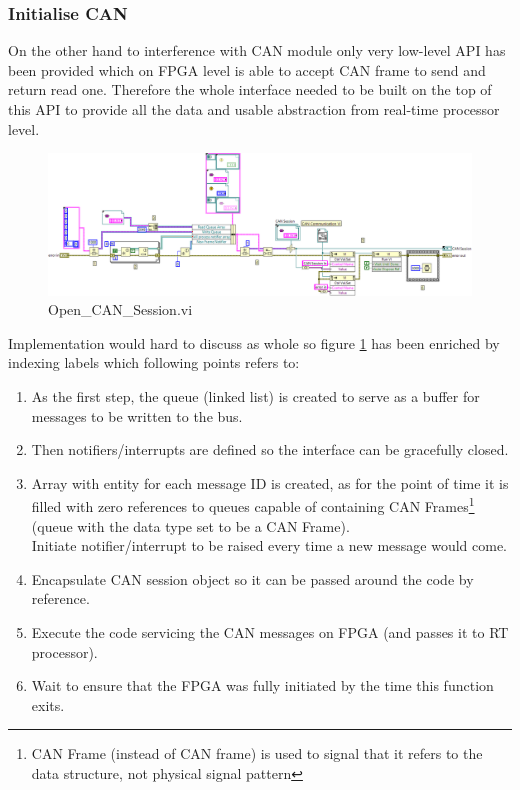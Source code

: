 \subsubsection{Initialise CAN}
On the other hand to interference with CAN module only very low-level API has been provided which on FPGA level is able to accept CAN frame to send and return read one. Therefore the whole interface needed to be built on the top of this API to provide all the data and usable abstraction from real-time processor level.
\begin{figure}[h]
    \centering
    \includegraphics[scale=\visc,max width=\textwidth]{figures/Open_CAN_Sessiond}
    \caption{Open\_CAN\_Session.vi}
    \label{vi:Open_CAN_Session}
\end{figure}
Implementation would hard to discuss as whole so figure \ref{vi:Open_CAN_Session} has been enriched by indexing labels which following points refers to:
\begin{enumerate}
    \item As the first step, the queue (linked list) is created to serve as a buffer for messages to be written to the bus.
    \item Then notifiers/interrupts are defined so the interface can be gracefully closed.
    \item Array with entity for each message ID is created, as for the point of time it is filled with zero references to queues capable of containing CAN Frames\footnote{CAN Frame (instead of CAN frame) is used to signal that it refers to the data structure, not physical signal pattern} (queue with the data type set to be a CAN Frame).
    \\
    Initiate notifier/interrupt to be raised every time a new message would come.
    \item Encapsulate CAN session object so it can be passed around the code by reference.
    \item Execute the code servicing the CAN messages on FPGA (and passes it to RT processor).
    \item Wait to ensure that the FPGA was fully initiated by the time this function exits.
\end{enumerate}

